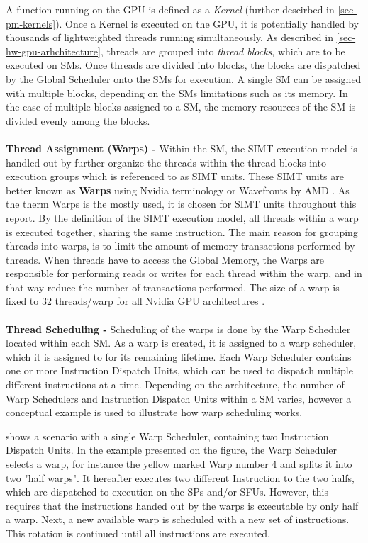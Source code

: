 A function running on the GPU is defined as a \textit{Kernel} (further descirbed in \cref{sec-pm-kernels}).
Once a Kernel is executed on the GPU, it is potentially handled by thousands of lightweighted threads running simultaneously.
As described in \cref{sec-hw-gpu-arhchitecture}, threads are grouped into \textit{thread blocks}, which are to be executed on SMs.
Once threads are divided into blocks, the blocks are dispatched by the Global Scheduler onto the SMs for execution.
A single SM can be assigned with multiple blocks, depending on the SMs limitations such as its memory.
In the case of multiple blocks assigned to a SM, the memory resources of the SM is divided evenly among the blocks.
\\\\
\textbf{Thread Assignment (Warps) -} Within the SM, the SIMT execution model is handled out by further organize the threads within the thread blocks into execution groups which is referenced to as SIMT units.
These SIMT units are better known as \textbf{Warps} using Nvidia terminology \cite{Nvidia2009} or Wavefronts by AMD \cite{Johansson2010}.
As the therm Warps is the mostly used, it is chosen for SIMT units throughout this report.
By the definition of the SIMT execution model, all threads within a warp is executed together, sharing the same instruction.
The main reason for grouping threads into warps, is to limit the amount of memory transactions performed by threads.
When threads have to access the Global Memory, the Warps are responsible for performing reads or writes for each thread within the warp, and in that way reduce the number of transactions performed.
The size of a warp is fixed to 32 threads/warp for all Nvidia GPU architectures \cite{Li2016}.
\\\\
\textbf{Thread Scheduling -} Scheduling of the warps is done by the Warp  Scheduler located within each SM.
As a warp is created, it is assigned to a warp scheduler, which it is assigned to for its remaining lifetime.
Each Warp Scheduler contains one or more Instruction Dispatch Units, which can be used to dispatch multiple different instructions at a time.
Depending on the architecture, the number of Warp Schedulers and Instruction Dispatch Units within a SM varies, however a conceptual example is used to illustrate how warp scheduling works.

 shows a scenario with a single Warp Scheduler, containing two Instruction Dispatch Units. 
In the example presented on the figure, the Warp Scheduler selects a warp, for instance the yellow marked Warp number 4 and splits it into two "half warps".
It hereafter executes two different Instruction to the two halfs, which are dispatched to execution on the SPs and/or SFUs.
However, this requires that the instructions handed out by the warps is executable by only half a warp.
Next, a new available warp is scheduled with a new set of instructions.
This rotation is continued until all instructions are executed.

